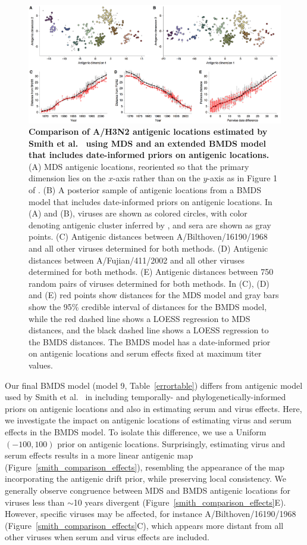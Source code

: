 \documentclass[11pt,oneside,letterpaper]{article}
\begin{document}
\begin{figure}[h]
	\centering		
	\includegraphics[width=1.0\textwidth]{figures/smith_comparison_drift}
	\caption{\textbf{Comparison of A/H3N2 antigenic locations estimated by Smith et al.\ \cite{Smith04} using MDS and an extended BMDS model that includes date-informed priors on antigenic locations.} 
	(A) MDS antigenic locations, reoriented so that the primary dimension lies on the $x$-axis rather than on the $y$-axis as in Figure 1 of \cite{Smith04}.
	(B) A posterior sample of antigenic locations from a BMDS model that includes date-informed priors on antigenic locations.
	In (A) and (B), viruses are shown as colored circles, with color denoting antigenic cluster inferred by \cite{Smith04}, and sera are shown as gray points.
	(C) Antigenic distances between A/Bilthoven/16190/1968 and all other viruses determined for both methods.
	(D) Antigenic distances between A/Fujian/411/2002 and all other viruses determined for both methods.
	(E) Antigenic distances between 750 random pairs of viruses determined for both methods.	
	In (C), (D) and (E) red points show distances for the MDS model and gray bars show the 95\% credible interval of distances for the BMDS model, while the red dashed line shows a LOESS regression to MDS distances, and the black dashed line shows a LOESS regression to the BMDS distances.
	The BMDS model has a date-informed prior on antigenic locations and serum effects fixed at maximum titer values. 	
	} 
	\label{smith_comparison_drift} 
\end{figure}

Our final BMDS model (model 9, Table~\ref{errortable}) differs from antigenic model used by Smith et al.\ \cite{Smith04} in including temporally- and phylogenetically-informed priors on antigenic locations and also in estimating serum and virus effects.
Here, we investigate the impact on antigenic locations of estimating virus and serum effects in the BMDS model.
To isolate this difference, we use a Uniform$(-100,100)$ prior on antigenic locations.
Surprisingly, estimating virus and serum effects results in a more linear antigenic map (Figure~\ref{smith_comparison_effects}), resembling the appearance of the map incorporating the antigenic drift prior, while preserving local consistency.
We generally observe congruence between MDS and BMDS antigenic locations for viruses less than $\sim$10 years divergent (Figure~\ref{smith_comparison_effects}E).
However, specific viruses may be affected, for instance A/Bilthoven/16190/1968 (Figure~\ref{smith_comparison_effects}C), which appears more distant from all other viruses when serum and virus effects are included.
\end{document}
